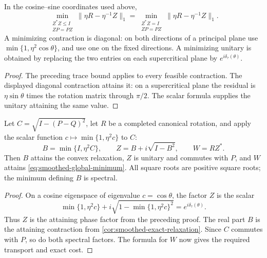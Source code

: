\begin{corollary}
\label{cor:smoothed-exact-relaxation}
In the cosine--sine coordinates used above,
\[
 \min_{\substack{Z^*Z\leq I\\ZP=PZ}}\|\eta R-\eta^{-1}Z\|_1
 =\min_{\substack{Z^*Z=I\\ZP=PZ}}\|\eta R-\eta^{-1}Z\|_1.
\]
A minimizing contraction is diagonal: on both directions of a principal
plane use $\min\{1,\eta^2\cos\theta\}$, and use one on the fixed
directions. A minimizing unitary is obtained by replacing the two entries
on each supercritical plane by $e^{i\delta_\tau(\theta)}$.
\end{corollary}

\begin{proof}
The preceding trace bound applies to every feasible contraction. The
displayed diagonal contraction attains it: on a supercritical plane
the residual is $\eta\sin\theta$ times the rotation matrix through $\pi/2$.
The scalar formula supplies the unitary attaining the same value.
\end{proof}

\begin{corollary}
\label{cor:smoothed-spectral-optimizer}
Let $C=\sqrt{I-(P-Q)^2}$, let $R$ be a completed canonical rotation,
and apply the scalar function $c\mapsto\min\{1,\eta^2c\}$ to $C$:
\[
 B=\min\{I,\eta^2C\},\qquad
 Z=B+i\sqrt{I-B^2},\qquad W=RZ^*.
\]
Then $B$ attains the convex relaxation, $Z$ is unitary and commutes
with $P$, and $W$ attains \cref{eq:smoothed-global-minimum}.
All square roots are positive square roots; the minimum defining $B$
is spectral.
\end{corollary}

\begin{proof}
On a cosine eigenspace of eigenvalue $c=\cos\theta$, the factor $Z$
is the scalar
\[
 \min\{1,\eta^2c\}
   +i\sqrt{1-\min\{1,\eta^2c\}^2}
 =e^{i\delta_\tau(\theta)}.
\]
Thus $Z$ is the attaining phase factor from the preceding proof.
The real part $B$ is the attaining contraction from
\cref{cor:smoothed-exact-relaxation}. Since $C$ commutes with $P$,
so do both spectral factors. The formula for $W$ now gives the
required transport and exact cost.
\end{proof}

